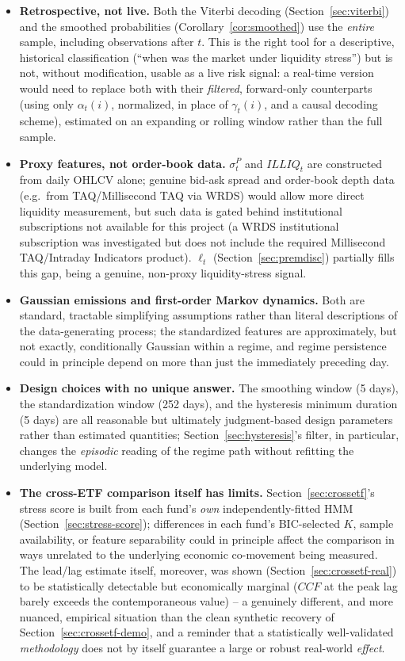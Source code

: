 \documentclass[11pt]{article}
\theoremstyle{definition}
\theoremstyle{remark}
\begin{document}
\begin{itemize}
    \item \textbf{Retrospective, not live.} Both the Viterbi decoding (Section~\ref{sec:viterbi}) and the smoothed probabilities (Corollary~\ref{cor:smoothed}) use the \emph{entire} sample, including observations after $t$. This is the right tool for a descriptive, historical classification (``when was the market under liquidity stress'') but is not, without modification, usable as a live risk signal: a real-time version would need to replace both with their \emph{filtered}, forward-only counterparts (using only $\alpha_t(i)$, normalized, in place of $\gamma_t(i)$, and a causal decoding scheme), estimated on an expanding or rolling window rather than the full sample.
    \item \textbf{Proxy features, not order-book data.} $\sigma^P_t$ and $ILLIQ_t$ are constructed from daily OHLCV alone; genuine bid-ask spread and order-book depth data (e.g.\ from TAQ/Millisecond TAQ via WRDS) would allow more direct liquidity measurement, but such data is gated behind institutional subscriptions not available for this project (a WRDS institutional subscription was investigated but does not include the required Millisecond TAQ/Intraday Indicators product). $\ell_t$ (Section~\ref{sec:premdisc}) partially fills this gap, being a genuine, non-proxy liquidity-stress signal.
    \item \textbf{Gaussian emissions and first-order Markov dynamics.} Both are standard, tractable simplifying assumptions rather than literal descriptions of the data-generating process; the standardized features are approximately, but not exactly, conditionally Gaussian within a regime, and regime persistence could in principle depend on more than just the immediately preceding day.
    \item \textbf{Design choices with no unique answer.} The smoothing window (5 days), the standardization window (252 days), and the hysteresis minimum duration (5 days) are all reasonable but ultimately judgment-based design parameters rather than estimated quantities; Section~\ref{sec:hysteresis}'s filter, in particular, changes the \emph{episodic} reading of the regime path without refitting the underlying model.
    \item \textbf{The cross-ETF comparison itself has limits.} Section~\ref{sec:crossetf}'s stress score is built from each fund's \emph{own} independently-fitted HMM (Section~\ref{sec:stress-score}); differences in each fund's BIC-selected $K$, sample availability, or feature separability could in principle affect the comparison in ways unrelated to the underlying economic co-movement being measured. The lead/lag estimate itself, moreover, was shown (Section~\ref{sec:crossetf-real}) to be statistically detectable but economically marginal ($CCF$ at the peak lag barely exceeds the contemporaneous value) -- a genuinely different, and more nuanced, empirical situation than the clean synthetic recovery of Section~\ref{sec:crossetf-demo}, and a reminder that a statistically well-validated \emph{methodology} does not by itself guarantee a large or robust real-world \emph{effect}.

\end{itemize}
\end{document}
